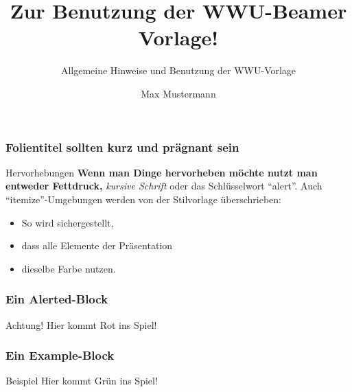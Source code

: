\documentclass{beamer}
\author{Max Mustermann}
\title{Zur Benutzung der WWU-Beamer Vorlage!}
\subtitle{Allgemeine Hinweise und Benutzung der WWU-Vorlage}
\begin{document}
\begin{frame}[plain]
  \maketitle
\end{frame}

\begin{frame}
  \frametitle{Folientitel sollten kurz und pr\"agnant sein}
  \begin{block}{Hervorhebungen}
    \textbf{Wenn man Dinge hervorheben m\"ochte nutzt man entweder Fettdruck,}
    \textit{ kursive Schrift} \alert{ oder das Schl\"usselwort ``alert''}.
  Auch ``itemize''-Umgebungen werden von der Stilvorlage überschrieben:
  \end{block}
  \pause
  \begin{itemize}
    \item So wird sichergestellt,
    \item dass alle Elemente der Präsentation 
    \item dieselbe Farbe nutzen.
  \end{itemize}
\end{frame}

\begin{frame}
  \frametitle{Ein Alerted-Block}
  \begin{alertblock}{Achtung!}
    Hier kommt Rot ins Spiel!
  \end{alertblock}
\end{frame}

\begin{frame}
  \frametitle{Ein Example-Block}
  \begin{exampleblock}{Beispiel}
    Hier kommt Grün ins Spiel!
  \end{exampleblock}
\end{frame}
\end{document}
